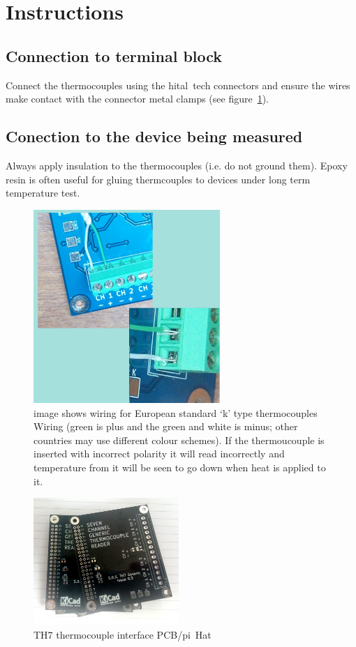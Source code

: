 \documentclass[a4paper,10pt]{article}
\begin{document}
\section{Instructions}
\subsection{Connection to terminal block}
Connect the thermocouples using the hital~tech connectors and ensure the wires make contact with the 
connector metal clamps (see figure~\ref{fig:con}).
\subsection{Conection to the device being measured}
Always apply insulation to the thermocouples (i.e. do not ground them).
Epoxy resin is often useful for gluing thermcouples to devices under long term temperature test.

\begin{figure}[h]
 \centering
 \includegraphics[width=200pt]{./wiring.jpg}
 \caption{image shows wiring for European standard `k' type thermocouples Wiring (green is plus and the green and white is minus; other countries may use different colour schemes). 
 If the thermoucouple is inserted with incorrect polarity it will read incorrectly and temperature from it will be seen to go down when heat is applied to it.}
 \label{fig:con}
\end{figure}

\begin{figure}[h]
 \centering
 \includegraphics[width=156pt]{./TH7_0p3.jpg}
 \caption{TH7 thermocouple interface PCB/pi~Hat}
 \label{fig:th7}
\end{figure}
\end{document}
